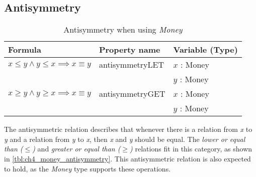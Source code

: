 \subsection*{Antisymmetry}
\label{ssct:properties_antisymmetry}
\begin{table}[!ht]
\centering
\begin{tabular}{lll}
\hline
                        \textbf{Formula}                              & \textbf{Property name} & \textbf{Variable (Type)} \\ \hline
\rowcolor[HTML]{EFEFEF} $x \leq y \land y \leq x \implies x \equiv y$ & antisymmetryLET        & $x$ : Money              \\
\rowcolor[HTML]{EFEFEF}                                               &                        & $y$ : Money              \\
                        $x \geq y \land y \geq x \implies x \equiv y$ & antisymmetryGET        & $x$ : Money              \\
                                                                      &                        & $y$ : Money              \\ \hline
\end{tabular}
\caption{Antisymmetry when using \textit{Money}}
\label{tbl:ch4_money_antisymmetry}
\end{table}
\FloatBarrier\noindent
The antisymmetric relation describes that whenever there is a relation from
\textit{x} to \textit{y} and a relation from \textit{y} to \textit{x}, then
\textit{x} and \textit{y} should be equal. The
\textit{lower or equal than ($\leq$)} and
\textit{greater or equal than ($\geq$)} relations fit in this category, as shown
in \autoref{tbl:ch4_money_antisymmetry}. This antisymmetric relation is also
expected to hold, as the \textit{Money} type supports these operations.
\clearpage %
